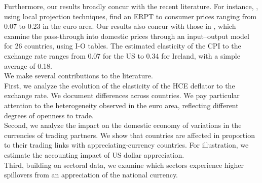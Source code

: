 \documentclass[11pt,a4paper]{paper} %
\begin{document}
Furthermore, our results broadly concur with the recent literature.
For instance, \cite{Colavecchio2020}, using local projection techniques, find an ERPT to consumer prices ranging from 0.07 to 0.23 in the euro area.
Our results also concur with those in \cite{Aydogus2018}, which examine the pass-through into domestic prices through an input–output model for 26 countries, using I-O tables. 
The estimated elasticity of the CPI to the exchange rate ranges from 0.07 for the US to 0.34 for Ireland, with a simple average of 0.18.\\
We make several contributions to the literature.\\
First, we analyze the evolution of the elasticity of the HCE deflator to the exchange rate. 
We document differences across countries.
We pay particular attention to the heterogeneity observed in the euro area, reflecting different degrees of openness to trade.\\
Second, we analyze the impact on the domestic economy of variations in the currencies of trading partners. 
We show that countries are affected in proportion to their trading links with appreciating-currency countries. 
For illustration, we estimate the accounting impact of US dollar appreciation.\\
Third, building on sectoral data, we examine which sectors experience higher spillovers from an appreciation of the national currency. 
\end{document}
